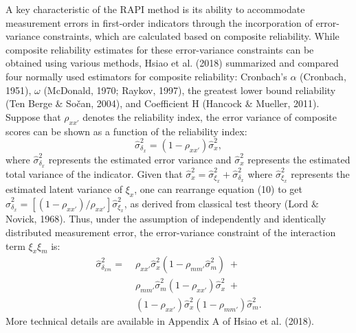\documentclass[
  man,mask]{apa6}
\begin{document}
A key characteristic of the RAPI method is its ability to accommodate measurement errors in first-order indicators through the incorporation of error-variance constraints, which are calculated based on composite reliability. While composite reliability estimates for these error-variance constraints can be obtained using various methods, Hsiao et al. (2018) summarized and compared four normally used estimators for composite reliability: Cronbach's \(\alpha\) (Cronbach, 1951), \(\omega\) (McDonald, 1970; Raykov, 1997), the greatest lower bound reliability (Ten Berge \& Sočan, 2004), and Coefficient H (Hancock \& Mueller, 2011). Suppose that \(\rho_{xx'}\) denotes the reliability index, the error variance of composite scores can be shown as a function of the reliability index:
\begin{equation}
\hat{\sigma}^2_{\delta_{x}} = (1 - \rho_{xx'})\hat{\sigma}^2_{{x}},
\end{equation}
where \(\hat{\sigma}^2_{\delta_{x}}\) represents the estimated error variance and \(\hat{\sigma}^2_{{x}}\) represents the estimated total variance of the indicator. Given that \(\hat{\sigma}^2_{{x}} = {\hat{\sigma}^2_{\xi_{x}} + \hat{\sigma}^2_{\delta_{x}}}\) where \(\hat{\sigma}^2_{\xi_{x}}\) represents the estimated latent variance of \(\xi_{x}\), one can rearrange equation (10) to get \(\hat{\sigma}_{\delta_{x}}^2 = [(1 - \rho_{xx'})/{\rho_{xx'}}]\hat{\sigma}^2_{\xi_{x}}\), as derived from classical test theory (Lord \& Novick, 1968). Thus, under the assumption of independently and identically distributed measurement error, the error-variance constraint of the interaction term \(\xi_{x}\xi_{m}\) is:
\begin{equation}
\begin{aligned}
\hat{\sigma}^2_{\delta_{xm}} =\; & \rho_{xx'}\hat{\sigma}^2_{{x}}(1 - \rho_{mm'}\hat{\sigma}^2_{{m}})\; + \\&
                        \rho_{mm'}\hat{\sigma}^2_{{m}}(1-\rho_{xx'})\hat{\sigma}^2_{{x}}\; + \\&
                        (1 - \rho_{xx'})\hat{\sigma}^2_{{x}}(1 - \rho_{mm'})\hat{\sigma}^2_{{m}}. 
\end{aligned}
\end{equation}
More technical details are available in Appendix A of Hsiao et al. (2018).
\end{document}
